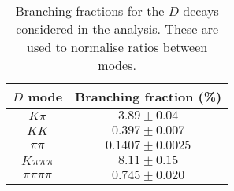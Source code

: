 \begin{table}
  \centering
  \begin{tabular}{cc}
      \toprule
      $D$ mode & Branching fraction (\%) \\
      \midrule
$K\pi$ & $3.89 \pm 0.04$ \\
$KK$ & $0.397 \pm 0.007$ \\
$\pi\pi$ & $0.1407 \pm 0.0025$ \\
$K\pi\pi\pi$ & $8.11 \pm 0.15$ \\
$\pi\pi\pi\pi$ & $0.745 \pm 0.020$ \\
      \bottomrule
  \end{tabular}
  \caption{Branching fractions for the $D$ decays considered in the analysis. These are used to normalise ratios between modes.}
\label{tab:branching_fractions}
\end{table}
